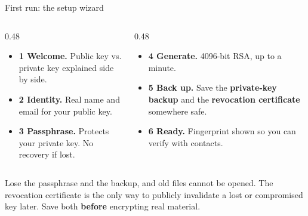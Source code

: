 \documentclass[aspectratio=169,11pt]{beamer}
\begin{document}
\begin{frame}{First run: the setup wizard}
  \begin{center}
  \end{center}
  \vspace{0.4em}
  \begin{columns}[T,onlytextwidth]
    \begin{column}{0.48\textwidth}
      \footnotesize
      \begin{itemize}
        \item \textbf{1 Welcome.} Public key vs. private key explained side by side.
        \item \textbf{2 Identity.} Real name and email for your public key.
        \item \textbf{3 Passphrase.} Protects your private key. No recovery if lost.
      \end{itemize}
    \end{column}
    \begin{column}{0.48\textwidth}
      \footnotesize
      \begin{itemize}
        \item \textbf{4 Generate.} 4096-bit RSA, up to a minute.
        \item \textbf{5 Back up.} Save the \textbf{private-key backup} and the \textbf{revocation certificate} somewhere safe.
        \item \textbf{6 Ready.} Fingerprint shown so you can verify with contacts.
      \end{itemize}
    \end{column}
  \end{columns}
  \vspace{0.2em}
  \begin{notebox}
    Lose the passphrase and the backup, and old files cannot be opened.
    The revocation certificate is the only way to publicly invalidate a lost
    or compromised key later. Save both \textbf{before} encrypting real material.
  \end{notebox}
\end{frame}
\end{document}

